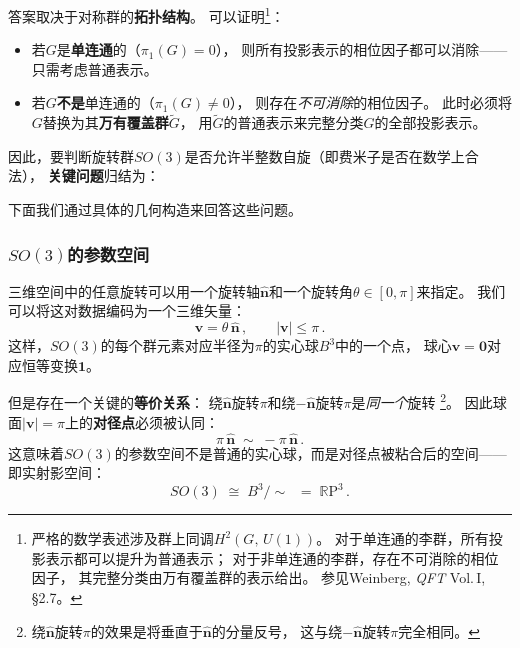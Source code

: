 答案取决于对称群的\textbf{拓扑结构}。
可以证明\footnote{%
    严格的数学表述涉及群上同调$H^2(G,\,U(1))$。
    对于单连通的李群，所有投影表示都可以提升为普通表示；
    对于非单连通的李群，存在不可消除的相位因子，
    其完整分类由万有覆盖群的表示给出。
    参见Weinberg, \textit{QFT} Vol.\,I, \S2.7。
}：
\begin{itemize}
    \item 若$G$是\textbf{单连通}的（$\pi_1(G)=0$），
    则所有投影表示的相位因子都可以消除——只需考虑普通表示。
    \item 若$G$\textbf{不是}单连通的（$\pi_1(G)\neq 0$），
    则存在\emph{不可消除}的相位因子。
    此时必须将$G$替换为其\textbf{万有覆盖群}$\widetilde{G}$，
    用$\widetilde{G}$的普通表示来完整分类$G$的全部投影表示。
\end{itemize}

因此，要判断旋转群$SO(3)$是否允许半整数自旋（即费米子是否在数学上合法），
\textbf{关键问题}归结为：

\begin{center}
\end{center}

\noindent 下面我们通过具体的几何构造来回答这些问题。

\subsubsection*{$SO(3)$的参数空间}

三维空间中的任意旋转可以用一个旋转轴$\hat{\boldsymbol{n}}$和一个旋转角$\theta\in[0,\pi]$来指定。
我们可以将这对数据编码为一个三维矢量：
\begin{equation}
    \boldsymbol{v} = \theta\,\hat{\boldsymbol{n}}\,,\qquad |\boldsymbol{v}|\leq\pi\,.
\end{equation}
这样，$SO(3)$的每个群元素对应半径为$\pi$的实心球$B^3$中的一个点，
球心$\boldsymbol{v}=\mathbf{0}$对应恒等变换$\mathbf{1}$。

但是存在一个关键的\textbf{等价关系}：
绕$\hat{\boldsymbol{n}}$旋转$\pi$和绕$-\hat{\boldsymbol{n}}$旋转$\pi$是\emph{同一个}旋转%
\footnote{%
绕$\hat{\boldsymbol{n}}$旋转$\pi$的效果是将垂直于$\hat{\boldsymbol{n}}$的分量反号，
这与绕$-\hat{\boldsymbol{n}}$旋转$\pi$完全相同。}。
因此球面$|\boldsymbol{v}|=\pi$上的\textbf{对径点}必须被认同：
\begin{equation}
    \pi\,\hat{\boldsymbol{n}} \;\sim\; -\pi\,\hat{\boldsymbol{n}}\,.
\end{equation}
这意味着$SO(3)$的参数空间不是普通的实心球，而是对径点被粘合后的空间——即实射影空间：
\begin{equation}
    SO(3) \;\cong\; B^3\!/\!\sim\;\; = \;\mathbb{R}\mathrm{P}^3\,.
\end{equation}

